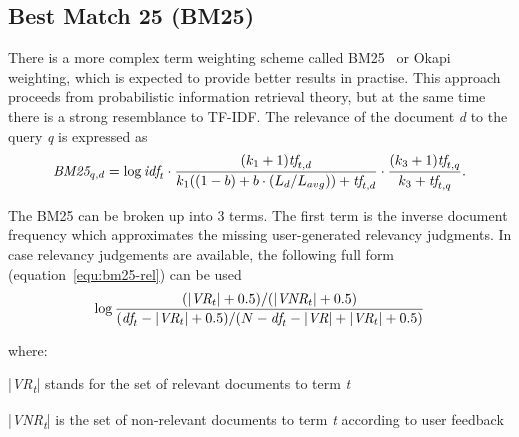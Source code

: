 \subsection{Best Match 25 (BM25)}
\label{section:bm25}
    There is a more complex term weighting scheme called BM25~\parencite{robertson2009probabilistic} or Okapi weighting, which is expected to provide better results in practise. This approach proceeds from probabilistic information retrieval theory, but at the same time there is a strong resemblance to TF-IDF. The relevance of the document \emph{d} to the query \emph{q} is expressed as
    \begin{gather} \label{equ:bm25}
        \emph{BM25}_{q, d} = 
        \log \emph{idf}_t
        \cdot \frac{(k_1 + 1) \emph{tf}_{t, d}}{k_1((1-b) + b \cdot (L_d / L_{avg})) + \emph{tf}_{t, d}} 
        \cdot \frac{(k_3 + 1)\emph{tf}_{t, q}}{k_3 + \emph{tf}_{t, q}}.
    \end{gather}

    The BM25 can be broken up into 3 terms. The first term is the inverse document frequency which approximates the missing user-generated relevancy judgments. In case relevancy judgements are available, the following full form (equation~\ref{equ:bm25-rel}) can be used
    \begin{equation}
        \label{equ:bm25-rel}
        \log \frac{(|\emph{VR}_t| + 0.5) / (|\emph{VNR}_t| + 0.5)}{(\emph{df}_t - |\emph{VR}_t| + 0.5) / (N - \emph{df}_t - |\emph{VR}| + |\emph{VR}_t| + 0.5)}
    \end{equation} 
    
    where:
    \begin{where}
        \item [|\emph{VR\textsubscript{t}}|] stands for the set of relevant documents to term \emph{t}
        \item [|\emph{VNR\textsubscript{t}}|] is the set of non-relevant documents to term \emph{t} according to user feedback~\parencite{manning2008introduction}
    \end{where}

